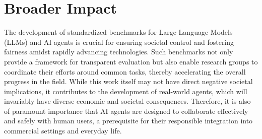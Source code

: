 \section*{Broader Impact}

The development of standardized benchmarks for Large Language Models (LLMs) and AI agents is crucial for ensuring societal control and fostering fairness amidst rapidly advancing technologies. Such benchmarks not only provide a framework for transparent evaluation but also enable research groups to coordinate their efforts around common tasks, thereby accelerating the overall progress in the field. While this work itself may not have direct negative societal implications, it contributes to the development of real-world agents, which will invariably have diverse economic and societal consequences. Therefore, it is also of paramount importance that AI agents are designed to collaborate effectively and safely with human users, a prerequisite for their responsible integration into commercial settings and everyday life.
